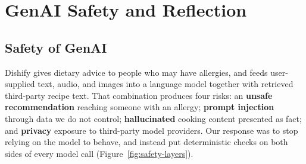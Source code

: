 \chapter{GenAI Safety and Reflection}
\label{ch:safety-reflection}

\section{Safety of GenAI}

Dishify gives dietary advice to people who may have allergies, and feeds
user-supplied text, audio, and images into a language model together with
retrieved third-party recipe text. That combination produces four risks: an
\textbf{unsafe recommendation} reaching someone with an allergy; \textbf{prompt
injection} through data we do not control; \textbf{hallucinated} cooking
content presented as fact; and \textbf{privacy} exposure to third-party model
providers. Our response was to stop relying on the model to behave, and instead
put deterministic checks on both sides of every model call
(Figure~\ref{fig:safety-layers}).

